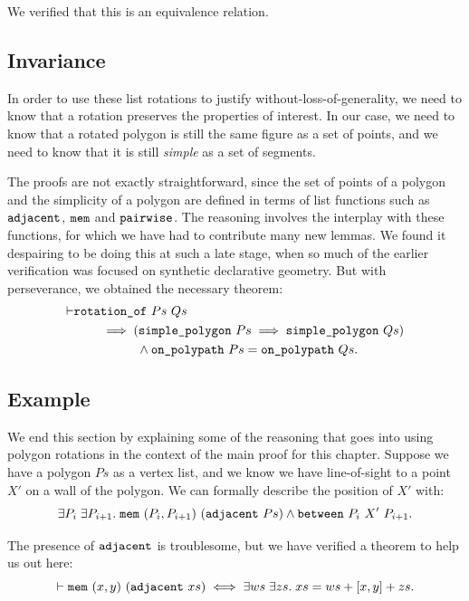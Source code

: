 We verified that this is an equivalence relation.

\subsection{Invariance}
In order to use these list rotations to justify without-loss-of-generality, we need to know that a rotation preserves the properties of interest. In our case, we need to know that a rotated polygon is still the same figure as a set of points, and we need to know that it is still \emph{simple} as a set of segments. 

The proofs are not exactly straightforward, since the set of points of a polygon and the simplicity of a polygon are defined in terms of list functions such as $\texttt{adjacent}$, $\texttt{mem}$ and $\texttt{pairwise}$. The reasoning involves the interplay with these functions, for which we have had to contribute many new lemmas. We found it despairing to be doing this at such a late stage, when so much of the earlier verification was focused on synthetic declarative geometry. But with perseverance, we obtained the necessary theorem:
\begin{equation}\label{eq:PolygonRotateInvariant}
\begin{aligned}
\vdash      &\texttt{rotation\_of}\ Ps\ Qs\\
    &\qquad\implies (\texttt{simple\_polygon}\ Ps \implies \texttt{simple\_polygon}\ Qs)\\
    &\qquad\qquad\quad\wedge \texttt{on\_polypath}\ Ps = \texttt{on\_polypath}\ Qs.
  \end{aligned}
\end{equation}

\subsection{Example}
We end this section by explaining some of the reasoning that goes into using polygon rotations in the context of the main proof for this chapter. Suppose we have a polygon $Ps$ as a vertex list, and we know we have line-of-sight to a point $X'$ on a wall of the polygon. We can formally describe the position of $X'$ with:
\begin{displaymath}
  \exists P_i\;\exists P_{i+1}.\; \texttt{mem}\ (P_i,P_{i+1})\ (\texttt{adjacent}\ Ps) \wedge \texttt{between}\ P_i\ X'\ P_{i+1}.
\end{displaymath}

The presence of $\texttt{adjacent}$ is troublesome, but we have verified a theorem to help us out here:
\begin{equation*}
\vdash  \texttt{mem}\ (x,y)\ (\texttt{adjacent}\ xs) \iff 
\exists ws\;\exists zs.\; xs = ws + [x,y] + zs.
\end{equation*}

